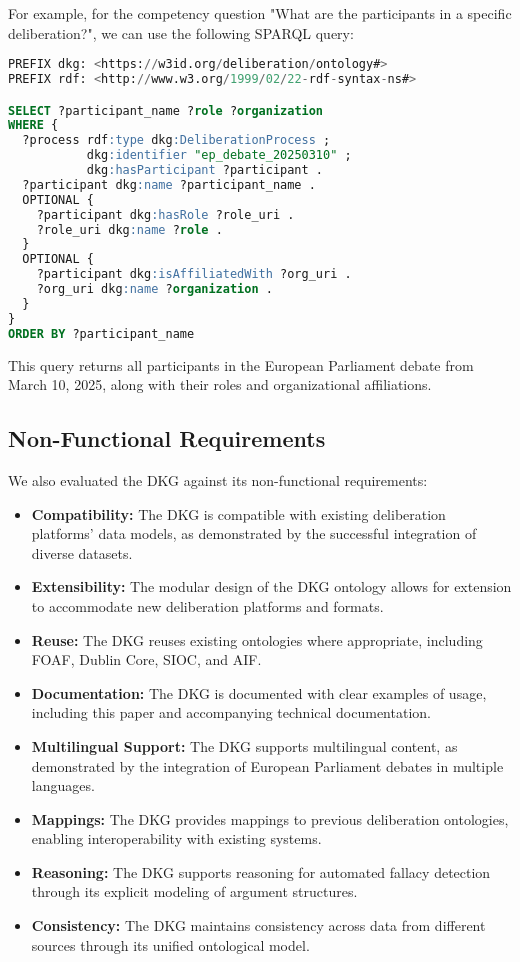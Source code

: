 \documentclass[runningheads]{llncs}  %
\begin{document}
For example, for the competency question "What are the participants in a specific deliberation?", we can use the following SPARQL query:

\begin{lstlisting}[language=sql]
PREFIX dkg: <https://w3id.org/deliberation/ontology#>
PREFIX rdf: <http://www.w3.org/1999/02/22-rdf-syntax-ns#>

SELECT ?participant_name ?role ?organization
WHERE {
  ?process rdf:type dkg:DeliberationProcess ;
           dkg:identifier "ep_debate_20250310" ;
           dkg:hasParticipant ?participant .
  ?participant dkg:name ?participant_name .
  OPTIONAL {
    ?participant dkg:hasRole ?role_uri .
    ?role_uri dkg:name ?role .
  }
  OPTIONAL {
    ?participant dkg:isAffiliatedWith ?org_uri .
    ?org_uri dkg:name ?organization .
  }
}
ORDER BY ?participant_name
\end{lstlisting}

This query returns all participants in the European Parliament debate from March 10, 2025, along with their roles and organizational affiliations.

\subsection{Non-Functional Requirements}
We also evaluated the DKG against its non-functional requirements:

\begin{itemize}
    \item \textbf{Compatibility:} The DKG is compatible with existing deliberation platforms' data models, as demonstrated by the successful integration of diverse datasets.
    \item \textbf{Extensibility:} The modular design of the DKG ontology allows for extension to accommodate new deliberation platforms and formats.
    \item \textbf{Reuse:} The DKG reuses existing ontologies where appropriate, including FOAF, Dublin Core, SIOC, and AIF.
    \item \textbf{Documentation:} The DKG is documented with clear examples of usage, including this paper and accompanying technical documentation.
    \item \textbf{Multilingual Support:} The DKG supports multilingual content, as demonstrated by the integration of European Parliament debates in multiple languages.
    \item \textbf{Mappings:} The DKG provides mappings to previous deliberation ontologies, enabling interoperability with existing systems.
    \item \textbf{Reasoning:} The DKG supports reasoning for automated fallacy detection through its explicit modeling of argument structures.
    \item \textbf{Consistency:} The DKG maintains consistency across data from different sources through its unified ontological model.
\end{itemize}
\end{document}
